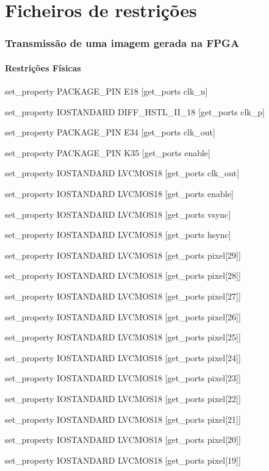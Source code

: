 {\tiny \chapter{Ficheiros de restrições} \label{ap2:codigo}}

\subsection{Transmissão de uma imagem gerada na FPGA} \label{ap2:planA}
\subsubsection{Restrições Físicas} \label{ap2:planA_physical_cnstrs}

set\_property PACKAGE\_PIN E18 [get\_ports clk\_n]

set\_property IOSTANDARD DIFF\_HSTL\_II\_18 [get\_ports clk\_p]

set\_property PACKAGE\_PIN E34 [get\_ports clk\_out]

set\_property PACKAGE\_PIN K35 [get\_ports enable]

set\_property IOSTANDARD LVCMOS18 [get\_ports clk\_out]

set\_property IOSTANDARD LVCMOS18 [get\_ports enable]

set\_property IOSTANDARD LVCMOS18 [get\_ports vsync]

set\_property IOSTANDARD LVCMOS18 [get\_ports hsync]

set\_property IOSTANDARD LVCMOS18 [get\_ports {pixel[29]}]

set\_property IOSTANDARD LVCMOS18 [get\_ports {pixel[28]}]

set\_property IOSTANDARD LVCMOS18 [get\_ports {pixel[27]}]

set\_property IOSTANDARD LVCMOS18 [get\_ports {pixel[26]}]

set\_property IOSTANDARD LVCMOS18 [get\_ports {pixel[25]}]

set\_property IOSTANDARD LVCMOS18 [get\_ports {pixel[24]}]

set\_property IOSTANDARD LVCMOS18 [get\_ports {pixel[23]}]

set\_property IOSTANDARD LVCMOS18 [get\_ports {pixel[22]}]

set\_property IOSTANDARD LVCMOS18 [get\_ports {pixel[21]}]

set\_property IOSTANDARD LVCMOS18 [get\_ports {pixel[20]}]

set\_property IOSTANDARD LVCMOS18 [get\_ports {pixel[19]}]

